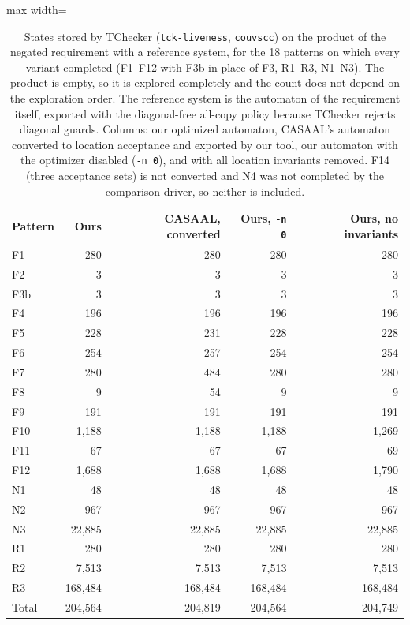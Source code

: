 \begin{table}[tp]
\centering
\caption{States stored by TChecker (\texttt{tck-liveness}, \texttt{couvscc}) on the product of the negated requirement with a reference system, for the 18 patterns on which every variant completed (F1--F12 with F3b in place of F3, R1--R3, N1--N3). The product is empty, so it is explored completely and the count does not depend on the exploration order. The reference system is the automaton of the requirement itself, exported with the diagonal-free all-copy policy because TChecker rejects diagonal guards. Columns: our optimized automaton, CASAAL's automaton converted to location acceptance and exported by our tool, our automaton with the optimizer disabled (\texttt{-n 0}), and with all location invariants removed. F14 (three acceptance sets) is not converted and N4 was not completed by the comparison driver, so neither is included.}
\label{tab:casaal-tck}
\scriptsize
\begin{adjustbox}{max width=\textwidth}\begin{tabular}{@{}lrrrr@{}}
\toprule
Pattern & Ours & CASAAL, converted & Ours, \texttt{-n 0} & Ours, no invariants \\
\midrule
F1 & 280 & 280 & 280 & 280 \\
F2 & 3 & 3 & 3 & 3 \\
F3b & 3 & 3 & 3 & 3 \\
F4 & 196 & 196 & 196 & 196 \\
F5 & 228 & 231 & 228 & 228 \\
F6 & 254 & 257 & 254 & 254 \\
F7 & 280 & 484 & 280 & 280 \\
F8 & 9 & 54 & 9 & 9 \\
F9 & 191 & 191 & 191 & 191 \\
F10 & 1{,}188 & 1{,}188 & 1{,}188 & 1{,}269 \\
F11 & 67 & 67 & 67 & 69 \\
F12 & 1{,}688 & 1{,}688 & 1{,}688 & 1{,}790 \\
N1 & 48 & 48 & 48 & 48 \\
N2 & 967 & 967 & 967 & 967 \\
N3 & 22{,}885 & 22{,}885 & 22{,}885 & 22{,}885 \\
R1 & 280 & 280 & 280 & 280 \\
R2 & 7{,}513 & 7{,}513 & 7{,}513 & 7{,}513 \\
R3 & 168{,}484 & 168{,}484 & 168{,}484 & 168{,}484 \\
\midrule
Total & 204{,}564 & 204{,}819 & 204{,}564 & 204{,}749 \\
\bottomrule
\end{tabular}\end{adjustbox}
\end{table}
